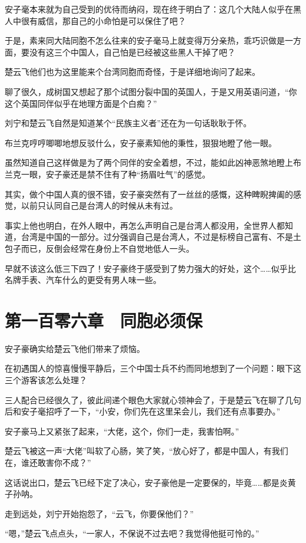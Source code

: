 安子毫本来就为自己受到的优待而纳闷，现在终于明白了：这几个大陆人似乎在黑人中很有威信，那自己的小命怕是可以保住了吧？

于是，素来同大陆同胞不怎么往来的安子毫马上就变得万分亲热，乖巧识做是一方面，要没有这三个中国人，自己怕是已经被这些黑人干掉了吧？

楚云飞他们也为这里能来个台湾同胞而奇怪，于是详细地询问了起来。

聊了很久，成树国又想起了那个试图分裂中国的英国人，于是又用英语问道，“你这个英国同伴似乎在地理方面是个白痴？”

刘宁和楚云飞自然是知道某个“民族主义者”还在为一句话耿耿于怀。

布兰克哼哼唧唧地想反驳什么，安子豪素知他的秉性，狠狠地瞪了他一眼。

虽然知道自己这样做是为了两个同伴的安全着想，不过，能如此凶神恶煞地瞪上布兰克一眼，安子豪还是禁不住有了种“扬眉吐气”的感觉。

其实，做个中国人真的很不错，安子豪突然有了一丝丝的感慨，这种睥睨捭阖的感觉，以前只认同自己是台湾人的时候从未有过。

事实上他也明白，在外人眼中，再怎么声明自己是台湾人都没用，全世界人都知道，台湾是中国的一部分。过分强调自己是台湾人，不过是标榜自己富有、不是土包子而已，反倒会经常在身份上不自觉地低人一头。

早就不该这么低三下四了！安子豪终于感受到了势力强大的好处，这个……似乎比名牌手表、汽车什么的更受有男人味一些。

\section{第一百零六章　同胞必须保}

安子豪确实给楚云飞他们带来了烦恼。

在初遇国人的惊喜慢慢平静后，三个中国士兵不约而同地想到了一个问题：眼下这三个游客该怎么处理？

三人配合已经很久了，彼此间递个眼色大家就心领神会了，于是楚云飞在聊了几句后和安子毫招呼了一下，“小安，你们先在这里呆会儿，我们还有点事要办。”

安子豪马上又紧张了起来，“大佬，这个，你们一走，我害怕啊。”

楚云飞被这一声“大佬”叫软了心肠，笑了笑，“放心好了，都是中国人，有我们在，谁还敢害你不成？”

这话说出口，楚云飞已经下定了决心，安子豪他是一定要保的，毕竟……都是炎黄子孙呐。

走到远处，刘宁开始抱怨了，“云飞，你要保他们？”

“嗯，”楚云飞点点头，“一家人，不保说不过去吧？我觉得他挺可怜的。”

